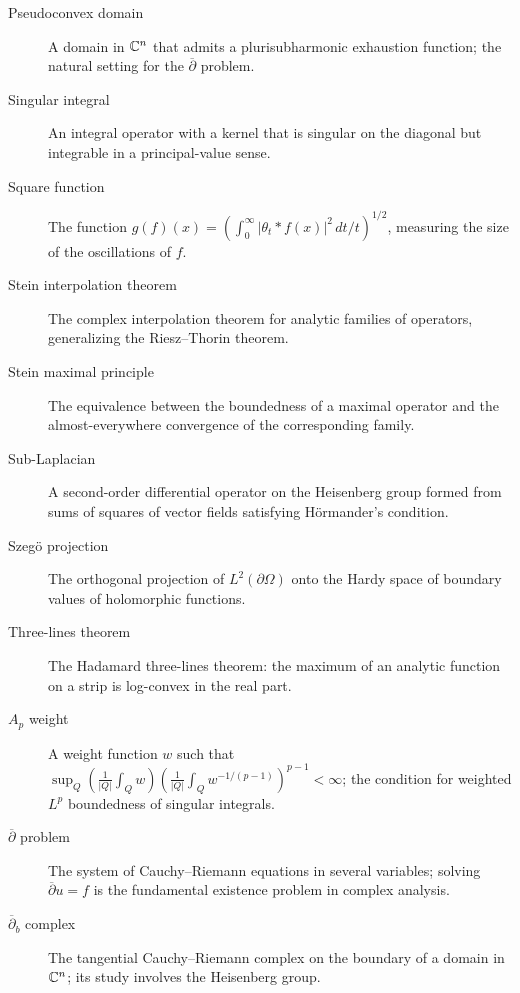 \begin{description}
    \item[Pseudoconvex domain] A domain in \(\mathbb{C}^n\) that admits a plurisubharmonic exhaustion function; the natural setting for the \(\overline{\partial}\) problem.
    \item[Singular integral] An integral operator with a kernel that is singular on the diagonal but integrable in a principal-value sense.
    \item[Square function] The function \(g(f)(x) = (\int_0^\infty |\theta_t * f(x)|^2\,dt/t)^{1/2}\), measuring the size of the oscillations of \(f\).
    \item[Stein interpolation theorem] The complex interpolation theorem for analytic families of operators, generalizing the Riesz--Thorin theorem.
    \item[Stein maximal principle] The equivalence between the boundedness of a maximal operator and the almost-everywhere convergence of the corresponding family.
    \item[Sub-Laplacian] A second-order differential operator on the Heisenberg group formed from sums of squares of vector fields satisfying H\"ormander's condition.
    \item[Szeg\"o projection] The orthogonal projection of \(L^2(\partial\Omega)\) onto the Hardy space of boundary values of holomorphic functions.
    \item[Three-lines theorem] The Hadamard three-lines theorem: the maximum of an analytic function on a strip is log-convex in the real part.
    \item[\(A_p\) weight] A weight function \(w\) such that \(\sup_Q (\frac1{|Q|}\int_Q w)(\frac1{|Q|}\int_Q w^{-1/(p-1)})^{p-1} < \infty\); the condition for weighted \(L^p\) boundedness of singular integrals.
    \item[\(\overline{\partial}\) problem] The system of Cauchy--Riemann equations in several variables; solving \(\overline{\partial} u = f\) is the fundamental existence problem in complex analysis.
    \item[\(\overline{\partial}_b\) complex] The tangential Cauchy--Riemann complex on the boundary of a domain in \(\mathbb{C}^n\); its study involves the Heisenberg group.
\end{description}
